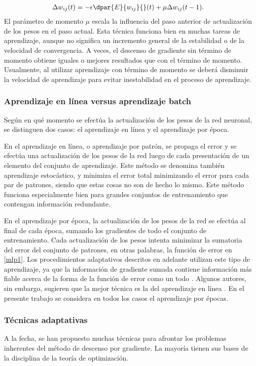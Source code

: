\begin{align}
\label{mlp8}
  \Delta w_{ij}(t) = - \epsilon \dpar{E}{w_{ij}}{}(t)
    + \mu \Delta w_{ij}(t-1).
\end{align}
El parámetro de momento $\mu$ escala la influencia del paso anterior
de actualización de los pesos en el paso actual. Esta técnica funciona
bien en muchas tareas de aprendizaje, aunque no significa un
incremento general de la estabilidad o de la velocidad de
convergencia.  A veces, el descenso de gradiente sin término de
momento obtiene iguales o mejores resultados que con el término de
momento. Usualmente, al utilizar aprendizaje con término de momento se
deberá disminuir la velocidad de aprendizaje para evitar inestabilidad
en el proceso de aprendizaje.

\subsubsection{Aprendizaje en línea versus aprendizaje batch}

Según en qué momento se efectúa la actualización de los pesos de la
red neuronal, se distinguen dos casos: el aprendizaje en línea y el
aprendizaje por época.

En el aprendizaje en línea, o aprendizaje por patrón, se
propaga el error y se efectúa una actualización de los pesos de la red
luego de cada
presentación de un elemento del conjunto de aprendizaje.
Este método se denomina también aprendizaje
estocástico, y minimiza el error total
minimizando el error para cada par de patrones, siendo que estas cosas
no son de hecho lo mismo. Este método funciona especialmente bien para
grandes conjuntos de entrenamiento que contengan información
redundante.

En el aprendizaje por época, la actualización de los pesos de la red
se efectúa al final de cada época, 
sumando los gradientes de todo el conjunto de entrenamiento.  Cada
actualización de los pesos intenta minimizar la sumatoria del error
del conjunto de patrones, en otras palabras, la función de error en
\autoref{mlp1}. Los procedimientos adaptativos descritos en adelante
utilizan este tipo de aprendizaje, ya que la información de gradiente
sumada contiene información más fiable acerca de la forma de la
función de error como un todo \cite{riedmiller}.  Algunos autores, sin
embargo, sugieren que la mejor técnica es la del aprendizaje en línea
\cite{haykin}.
En el presente trabajo se considera en todos los casos el aprendizaje
por épocas.

\subsubsection{Técnicas adaptativas}
A la fecha, se han propuesto muchas técnicas para afrontar los
problemas inherentes del método de descenso por gradiente. La mayoría
tienen sus bases de la disciplina de la teoría de
optimización.

